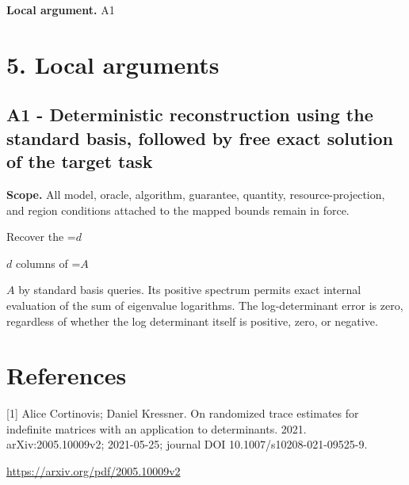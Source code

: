 \documentclass[10pt,a4paper]{article}
\newcommand{\AtlasMath}[1]{\par\begingroup\centering\setbox0=\hbox{$\displaystyle #1$}\ifdim\wd0>1.4\linewidth\typeout{ATLAS WIDE FORMULA: \the\wd0}\fi\ifdim\wd0>\linewidth\resizebox{\linewidth}{!}{\box0}\else\box0\fi\par\endgroup}
\newcommand{\AtlasInlineMath}[1]{\begingroup\setbox0=\hbox{$#1$}\ifdim\wd0>.4\linewidth\endgroup\AtlasMath{#1}\else\endgroup$#1$\fi}
\begin{document}
\textbf{Local argument.} A1

\section{5. Local arguments}
\subsection{A1 - Deterministic reconstruction using the standard basis, followed by free exact solution of the target task}
\textbf{Scope.} All model, oracle, algorithm, guarantee, quantity, resource-projection, and region conditions attached to the mapped bounds remain in force.

Recover the \AtlasInlineMath{d} columns of \AtlasInlineMath{A} by standard basis queries. Its positive spectrum permits exact internal evaluation of the sum of eigenvalue logarithms. The log-determinant error is zero, regardless of whether the log determinant itself is positive, zero, or negative.

\section{References}
[1] Alice Cortinovis; Daniel Kressner. On randomized trace estimates for indefinite matrices with an application to determinants. 2021. arXiv:2005.10009v2; 2021-05-25; journal DOI 10.1007/s10208-021-09525-9.

\url{https://arxiv.org/pdf/2005.10009v2}
\end{document}
